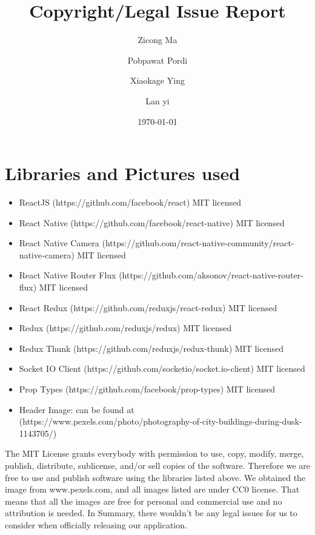 \documentclass[a4wide, 11pt]{article}
\begin{document}
\title{Copyright/Legal Issue Report}

\author{Zicong Ma \and Pobpawat Pordi \and Xiaokage Ying \and Lan yi}

\date{\today}         %

\maketitle            %

\section{Libraries and Pictures used}
\begin{itemize}

    \item ReactJS (https://github.com/facebook/react) MIT licensed
    \item React Native (https://github.com/facebook/react-native) MIT licensed 
    \item React Native Camera (https://github.com/react-native-community/react-native-camera) MIT licensed 
    \item React Native Router Flux (https://github.com/aksonov/react-native-router-flux) MIT licensed  
    \item React Redux (https://github.com/reduxjs/react-redux) MIT licensed 
    \item Redux (https://github.com/reduxjs/redux) MIT licensed 
    \item Redux Thunk (https://github.com/reduxjs/redux-thunk) MIT licensed 
    \item Socket IO Client (https://github.com/socketio/socket.io-client) MIT licensed
    \item Prop Types (https://github.com/facebook/prop-types) MIT licensed
    \item Header Image: can be found at (https://www.pexels.com/photo/photography-of-city-buildings-during-dusk-1143705/)
    
\end{itemize}

The MIT License grants everybody with permission to use, copy, modify, merge, publish, distribute, sublicense, and/or sell copies of the software. Therefore we are free to use and publish software using the libraries listed above. We obtained the image from www.pexels.com, and all images listed are under CC0 license. That means that all the images are free for personal and commercial use and no attribution is needed.
In Summary, there wouldn't be any legal issues for us to consider when officially releasing our application.
\end{document}
